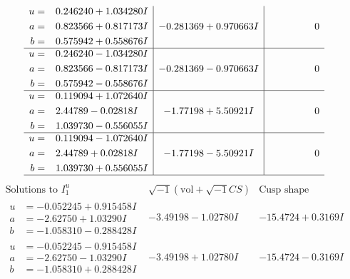 \documentclass[1p]{elsarticle_modified}
\theoremstyle{definition}
\newcommand{\I}{\sqrt{-1}}
\begin{document}
$$\begin{array}{c|c|c}
\begin{aligned}
u &= \phantom{-}0.246240 + 1.034280 I \\
a &= \phantom{-}0.823566 + 0.817173 I \\
b &= \phantom{-}0.575942 + 0.558676 I\end{aligned}
 & -0.281369 + 0.970663 I & \phantom{-0.000000 } 0 \\ \hline\begin{aligned}
u &= \phantom{-}0.246240 - 1.034280 I \\
a &= \phantom{-}0.823566 - 0.817173 I \\
b &= \phantom{-}0.575942 - 0.558676 I\end{aligned}
 & -0.281369 - 0.970663 I & \phantom{-0.000000 } 0 \\ \hline\begin{aligned}
u &= \phantom{-}0.119094 + 1.072640 I \\
a &= \phantom{-}2.44789 - 0.02818 I \\
b &= \phantom{-}1.039730 - 0.556055 I\end{aligned}
 & -1.77198 + 5.50921 I & \phantom{-0.000000 } 0 \\ \hline\begin{aligned}
u &= \phantom{-}0.119094 - 1.072640 I \\
a &= \phantom{-}2.44789 + 0.02818 I \\
b &= \phantom{-}1.039730 + 0.556055 I\end{aligned}
 & -1.77198 - 5.50921 I & \phantom{-0.000000 } 0\\
 \hline 
 \end{array}$$\newpage$$\begin{array}{c|c|c}  
\text{Solutions to }I^u_{1}& \I (\text{vol} + \sqrt{-1}CS) & \text{Cusp shape}\\
 \hline 
\begin{aligned}
u &= -0.052245 + 0.915458 I \\
a &= -2.62750 + 1.03290 I \\
b &= -1.058310 - 0.288428 I\end{aligned}
 & -3.49198 - 1.02780 I & -15.4724 + 0.3169 I \\ \hline\begin{aligned}
u &= -0.052245 - 0.915458 I \\
a &= -2.62750 - 1.03290 I \\
b &= -1.058310 + 0.288428 I\end{aligned}
 & -3.49198 + 1.02780 I & -15.4724 - 0.3169 I \\ \hline\begin{aligned}

\end{aligned}
\end{array}$$
\end{document}
